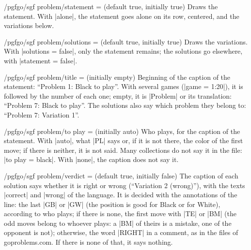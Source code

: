 
\begin{key}{/pgfgo/sgf problem/statement =  (default true, initially true)}
	Draws the statement. With |alone|, the statement goes alone on its row, centered, and the variations below.
\end{key}

\begin{key}{/pgfgo/sgf problem/solutions =  (default true, initially true)}
	Draws the variations. With |solutions = false|, only the statement remains; the solutions go elsewhere, with |statement = false|.

	\begin{codeexample}
	\end{codeexample}

\end{key}

\begin{key}{/pgfgo/sgf problem/title =  (initially empty)}
	Beginning of the caption of the statement: ``Problem 1: Black to play''. With several games (|game = 1:20|), it is followed by the number of each one; empty, it is |Problem| or its translation: ``Problem 7: Black to play''. The solutions also say which problem they belong to: ``Problem 7: Variation 1''.
\end{key}

\begin{key}{/pgfgo/sgf problem/to play =  (initially auto)}
	Who plays, for the caption of the statement. With |auto|, what |PL| says or, if it is not there, the color of the first move; if there is neither, it is not said. Many collections do not say it in the file: |to play = black|. With |none|, the caption does not say it.
\end{key}

\begin{key}{/pgfgo/sgf problem/verdict =  (default true, initially false)}
	The caption of each solution says whether it is right or wrong (``Variation 2 (wrong)''), with the texts |correct| and |wrong| of the language. It is decided with the annotations of the line: the last |GB| or |GW| (the position is good for Black or for White), according to who plays; if there is none, the first move with |TE| or |BM| (the odd moves belong to whoever plays: a |BM| of theirs is a mistake, one of the opponent is not); otherwise, the word |RIGHT| in a comment, as in the files of goproblems.com. If there is none of that, it says nothing.

	\begin{codeexample}[]
	\end{codeexample}
\end{key}

